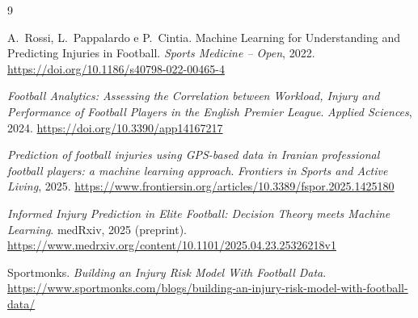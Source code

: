 \documentclass[11pt,a4paper]{article}
\begin{document}
\begin{thebibliography}{9}

A.~Rossi, L.~Pappalardo e P.~Cintia.
\newblock Machine Learning for Understanding and Predicting Injuries in Football.
\newblock \textit{Sports Medicine -- Open}, 2022.
\newblock \url{https://doi.org/10.1186/s40798-022-00465-4}

\textit{Football Analytics: Assessing the Correlation between Workload, Injury and Performance of Football Players in the English Premier League}.
\newblock \textit{Applied Sciences}, 2024.
\newblock \url{https://doi.org/10.3390/app14167217}

\textit{Prediction of football injuries using GPS-based data in Iranian professional football players: a machine learning approach}.
\newblock \textit{Frontiers in Sports and Active Living}, 2025.
\newblock \url{https://www.frontiersin.org/articles/10.3389/fspor.2025.1425180}

\textit{Informed Injury Prediction in Elite Football: Decision Theory meets Machine Learning}.
\newblock medRxiv, 2025 (preprint).
\newblock \url{https://www.medrxiv.org/content/10.1101/2025.04.23.25326218v1}

Sportmonks.
\newblock \textit{Building an Injury Risk Model With Football Data}.
\newblock \url{https://www.sportmonks.com/blogs/building-an-injury-risk-model-with-football-data/}

\end{thebibliography}
\end{document}

